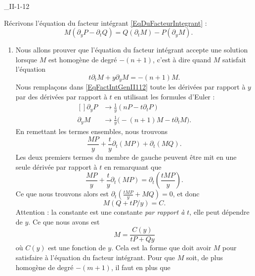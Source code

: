 \begin{corrige}{_II-1-12}

Récrivons l'équation du facteur intégrant \eqref{EqDuFacteurIntegrant} :
\begin{equation}		\label{EqFactIntGenII112}
	M(\partial_yP-\partial_tQ)=Q(\partial_tM)-P(\partial_yM).
\end{equation}

\begin{enumerate}

\item
Nous allons prouver que l'équation du facteur intégrant accepte une solution lorsque $M$ est homogène de degré $-(n+1)$, c'est à dire quand $M$ satisfait l'équation
\begin{equation}
	t\partial_tM+y\partial_yM=-(n+1)M.
\end{equation}
Nous remplaçons dans \eqref{EqFactIntGenII112} toute les dérivées par rapport à $y$ par des dérivées par rapport à $t$ en utilisant les formules d'Euler :
\begin{equation}
	\begin{aligned}[]
		\partial_yP	&\to \frac{1}{ y }(nP-t\partial_tP)\\
		\partial_yM	&\to \frac{1}{ y }\big( -(n+1)M-t\partial_tM \big).
	\end{aligned}
\end{equation}
En remettant les termes ensembles, nous trouvons
\begin{equation}
	\frac{ MP }{ y }+\frac{ t }{ y }\partial_t(MP)+\partial_t(MQ).
\end{equation}
Les deux premiers termes du membre de gauche peuvent être mit en une seule dérivée par rapport à $t$ en remarquant que
\begin{equation}
	\frac{ MP }{ y }+\frac{ t }{ y }\partial_t(MP)=\partial_t\left( \frac{ tMP }{ y } \right).
\end{equation}
Ce que nous trouvons alors est $\partial_t\left( \frac{ tMP }{ y }+MQ \right)=0$, et donc
\begin{equation}
 	M(Q+tP/y)=C.
\end{equation}
 Attention : la constante est une constante \emph{par rapport à $t$}, elle peut dépendre de $y$. Ce que nous avons est
\begin{equation}
	M=\frac{ C(y) }{ tP+Qy }
\end{equation}
où $C(y)$ est une fonction de $y$. Cela est la forme que doit avoir $M$ pour satisfaire à l'équation du facteur intégrant. Pour que $M$ soit, de plus homogène de degré $-(m+1)$, il faut en plus que

\end{enumerate}
\end{corrige}
